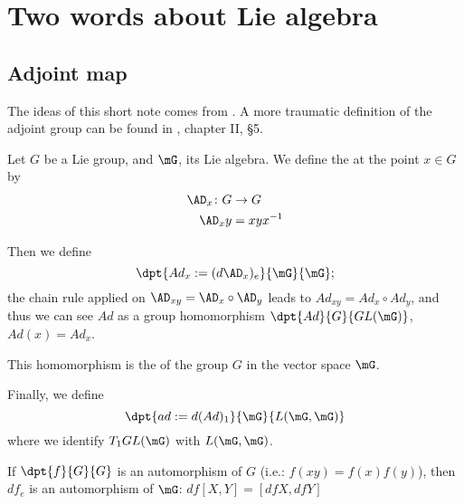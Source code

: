 \section{Two words about Lie algebra}


\subsection{Adjoint map}

The ideas of this short note comes from \cite{Lie}. A more traumatic definition of the adjoint group can be found in \cite{Helgason}, chapter II, \S 5. 

\begin{definition}
    Let $G$ be a Lie group, and $\mG$, its Lie algebra. We define the  at the point $x\in G$ by
    \begin{equation}
        \begin{aligned}
            \AD_x\colon G&\to G \\
            \AD_xy&=xyx^{-1}
        \end{aligned}
    \end{equation}
\end{definition}

Then we define
\[
\dpt{Ad_x:=(d\AD_x)_e}{\mG}{\mG};
\]
the chain rule applied on $\AD_{xy}=\AD_x\circ\AD_y$ leads to $Ad_{xy}=Ad_x\circ Ad_y$, and thus we can see $Ad$ as a group homomorphism $\dpt{Ad}{G}{GL(\mG)}$, $Ad(x)=Ad_x$.

\begin{definition}
This homomorphism is the  of the group $G$ in the vector space $\mG$.
\end{definition}


Finally, we define
\[
 \dpt{ad:=d(Ad)_1}{\mG}{L(\mG,\mG)}
\]
 where we identify $T_1GL(\mG)$ with $L(\mG,\mG)$.

\begin{lemma}\label{LEMooEALFooJOeOgk}
    If $\dpt{f}{G}{G}$ is an automorphism of $G$ (i.e.: $f(xy)=f(x)f(y)$), then $df_e$ is an automorphism of $\mG$: $df[X,Y]=[df X,dfY]$
\end{lemma}

